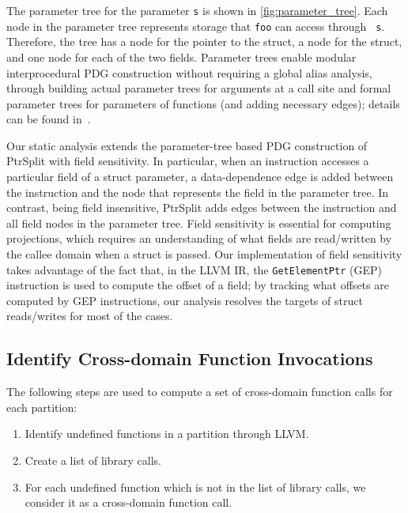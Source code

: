\documentclass[pageno]{jpaper}
\begin{document}
The parameter tree for the parameter {\tt s} is shown in
\autoref{fig:parameter_tree}. Each node in the parameter tree
represents storage that {\tt foo} can access through {\tt
  s}. Therefore, the tree has a node for the pointer to the struct, a
node for the struct, and one node for each of the two
fields. Parameter trees enable modular interprocedural PDG
construction without requiring a global alias analysis, through
building actual parameter trees for arguments at a call site and
formal parameter trees for parameters of functions (and adding
necessary edges); details can be found in~\cite{LiuTJ17Ptrsplit}.



Our static analysis extends the parameter-tree based PDG construction
of PtrSplit with field sensitivity. In particular, when an instruction
accesses a particular field of a struct parameter, a data-dependence
edge is added between the instruction and the node that represents the
field in the parameter tree. In contrast, being field insensitive,
PtrSplit adds edges between the instruction and all field nodes in the
parameter tree. Field sensitivity is essential for computing
projections, which requires an understanding of what fields are
read/written by the callee domain when a struct is passed.  Our
implementation of field sensitivity takes advantage of the fact that,
in the LLVM IR, the {\tt GetElementPtr} (GEP) instruction is
used to compute the offset of a field; by tracking what offsets are
computed by GEP instructions, our analysis resolves the targets of 
struct reads/writes for most of the cases.

\subsection{Identify Cross-domain Function Invocations}
The following steps are used to compute a set of cross-domain function calls for each partition:
\begin{enumerate}
  \item Identify undefined functions in a partition through LLVM.
  \item Create a list of library calls.
  \item For each undefined function which is not in the list of library calls, we consider it as a cross-domain function call.
\end{enumerate}
\end{document}
